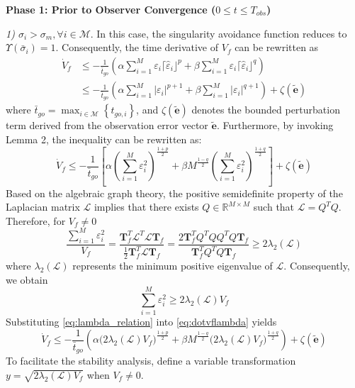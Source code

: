 \documentclass[lettersize,journal]{IEEEtran}
\begin{document}
\textbf{Phase 1: Prior to Observer Convergence ($0 \le t \le T_{obs}$)} 

\textit{1) ${\sigma}_i > {\sigma}_m, \forall i \in \mathcal{M}$}. In this case, the singularity avoidance function reduces to $\Upsilon(\bar{\sigma}_i) = 1$. Consequently, the time derivative of $V_f$ can be rewritten as
\begin{equation}
	\label{eq:Vfcase1}
	\begin{aligned}
		\dot{V}_f
		&\leq  -\frac{1}{\bar{t}_{go}}
		\left(
		\alpha \sum_{i=1}^{M} \varepsilon_i \lceil \hat{\varepsilon}_i \rfloor^p
		+ \beta \sum_{i=1}^{M} \varepsilon_i \lceil \hat{\varepsilon}_i \rfloor^q
		\right) \
		 \\ &  \leq -\frac{1}{\bar{t}_{go}}
		\left(
		\alpha \sum_{i=1}^{M} \left| \varepsilon_i \right|^{p+1}
		+ \beta \sum_{i=1}^{M} \left| \varepsilon_i \right| ^{q+1}
		\right)+ \zeta (\tilde{\mathbf{e}})
	\end{aligned}
\end{equation}
where ${\bar{t}_{go}}=\max _{i \in \mathcal{M}}\left\{t_{go,i}\right\}$, and $\zeta (\tilde{\mathbf{e}})$ denotes the bounded perturbation term derived from the observation error vector $\tilde{\mathbf{e}}$. Furthermore, by invoking Lemma 2, the inequality can be rewritten as:
\begin{equation}
	\label{eq:dotvflambda}
	\dot{V}_f \leq -\frac{1}{\bar{t}_{go}}\left[ \alpha \left( \sum_{i=1}^{M} \varepsilon_{i}^{2} \right)^{\frac{1+p}{2}} + \beta M^{\frac{1-q}{2}} \left( \sum_{i=1}^{M} \varepsilon_{i}^{2} \right)^{\frac{1+q}{2}} \right] + \zeta (\tilde{\mathbf{e}})
\end{equation}
Based on the algebraic graph theory, the positive semidefinite property of the Laplacian matrix $\mathcal{L}$ implies that there exists $Q \in \mathbb{R}^{M \times M}$ such that $\mathcal{L} = Q^T Q$. Therefore, for $V_f \neq 0$
\begin{equation}
	\frac{\sum_{i=1}^{M} \varepsilon_{i}^{2}}{V_f} = \frac{\boldsymbol{T}_f^T \mathcal{L}^T \mathcal{L} \boldsymbol{T}_f}{\frac{1}{2} \boldsymbol{T}_f^T \mathcal{L} \boldsymbol{T}_f} = \frac{2 \boldsymbol{T}_f^T Q^T Q Q^T Q \boldsymbol{T}_f}{\boldsymbol{T}_f^T Q^T Q \boldsymbol{T}_f} \ge 2 \lambda_2(\mathcal{L})
\end{equation}
where $\lambda_2(\mathcal{L})$ represents the minimum positive eigenvalue of $\mathcal{L}$. Consequently, we obtain
\begin{equation}
	\label{eq:lambda_relation}
	\sum_{i=1}^{M} \varepsilon_{i}^{2} \ge 2 \lambda_2(\mathcal{L}) V_f
\end{equation}
Substituting \eqref{eq:lambda_relation} into \eqref{eq:dotvflambda} yields
\begin{equation}
	\dot{V}_f \leq -\frac{1}{\bar{t}_{go}}
	\left(
	\alpha \bigl(2\lambda_2(\mathcal{L}) V_f\bigr)^{\frac{1+p}{2}}
	+ \beta M^{\frac{1-q}{2}}
	\bigl(2\lambda_2(\mathcal{L}) V_f\bigr)^{\frac{1+q}{2}}
	\right)
	+ \zeta(\tilde{\mathbf{e}})
\end{equation}
To facilitate the stability analysis, define a variable transformation $y = \sqrt{2\lambda_2(\mathcal{L}) V_f}$ when $V_f \neq 0$.
\end{document}
